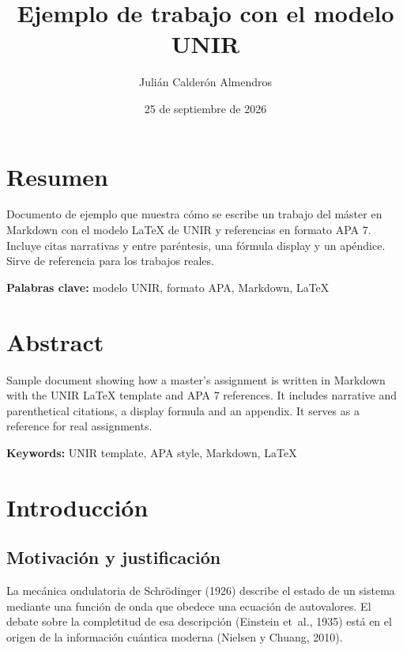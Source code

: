 \documentclass[11pt,a4paper,spanish]{book}
\title{Ejemplo de trabajo con el modelo UNIR}
\author{Julián Calderón Almendros}
\date{25 de septiembre de 2026}
\begin{document}
\renewcommand{\listfigurename}{Índice de figuras}
\renewcommand{\listtablename}{Índice de tablas}
\renewcommand{\contentsname}{Índice de contenidos}
\renewcommand{\figurename}{Figura}
\renewcommand{\tablename}{Tabla}

\maketitle

\frontmatter
\tableofcontents

\chapter{Resumen}
Documento de ejemplo que muestra cómo se escribe un trabajo del máster
en Markdown con el modelo LaTeX de UNIR y referencias en formato APA 7.
Incluye citas narrativas y entre paréntesis, una fórmula display y un
apéndice. Sirve de referencia para los trabajos reales.

\vspace{\baselineskip}
{\bf Palabras clave:} modelo UNIR, formato APA, Markdown, LaTeX

\chapter{Abstract}
Sample document showing how a master's assignment is written in Markdown
with the UNIR LaTeX template and APA 7 references. It includes narrative
and parenthetical citations, a display formula and an appendix. It
serves as a reference for real assignments.

\vspace{\baselineskip}
{\bf Keywords:} UNIR template, APA style, Markdown, LaTeX

\mainmatter
\chapter{Introducción}\label{introducciuxf3n}

\section{Motivación y
justificación}\label{motivaciuxf3n-y-justificaciuxf3n}

La mecánica ondulatoria de Schrödinger (1926) describe el estado de un
sistema mediante una función de onda que obedece una ecuación de
autovalores. El debate sobre la completitud de esa descripción (Einstein
et~al., 1935) está en el origen de la información cuántica moderna
(Nielsen y Chuang, 2010).
\end{document}
